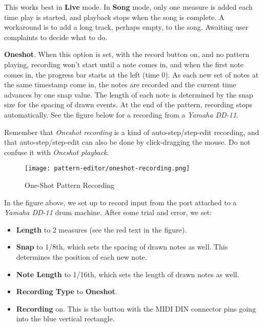 \begin{enumber}
         This works best in \textbf{Live} mode.
         In \textbf{Song} mode, only one measure is added each time play is
         started, and playback stops when the song is complete.
         A workaround is to add a long track, perhaps empty, to the song.
         Awaiting user complaints to decide what to do.
      \item \textbf{Oneshot}.
         When this option is set, with the record button on, and no pattern
         playing, recording won't start until a note comes in, and when the
         first note comes in, the progress bar starts at the left (time 0).
         As each new set of notes at the same timestamp come in, the
         notes are recorded and the current time advances by one snap value.
         The length of each note is determined by the snap size for the spacing
         of drawn events.
         At the end of the pattern, recording stops automatically.
         See the figure
         below for a recording from a \textsl{Yamaha DD-11}.
   \end{enumber}

   Remember that \textsl{Oneshot recording} is a kind of auto-step/step-edit
   recording, and that auto-step/step-edit can also be done by click-dragging
   the mouse.  Do not confuse it with \textsl{Oneshot playback}.

\begin{figure}[H]
   \centering 
   \texttt{[image: pattern-editor/oneshot-recording.png]}
   \caption{One-Shot Pattern Recording}
   \label{fig:pattern_editor_oneshot_recording}
\end{figure}

   In the figure above, we set up to record input from the port attached to a
   \textsl{Yamaha DD-11} drum machine.  After some trial and error,
   we set:

   \begin{itemize}
      \item \textbf{Length} to 2 measures (see the red text in the figure).
      \item \textbf{Snap} to 1/8th, which sets the spacing of drawn notes as
         well.  This determines the position of each new note.
      \item \textbf{Note Length} to 1/16th, which sets the length of drawn
         notes as well.
      \item \textbf{Recording Type} to \textbf{Oneshot}.
      \item \textbf{Recording} on. This is the button with the MIDI DIN
         connector pins going into the blue vertical rectangle.
   \end{itemize}

